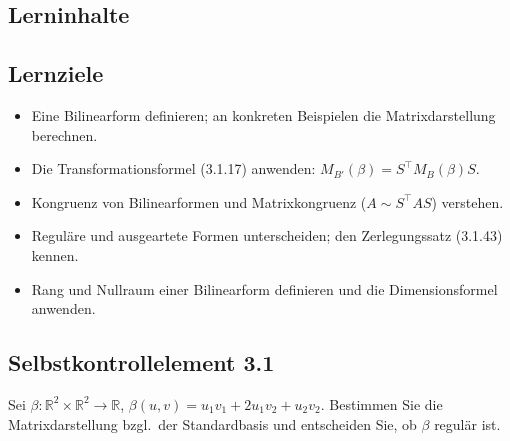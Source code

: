\documentclass[a4paper,12pt]{article}
\begin{document}
\subsection*{Lerninhalte}
\begin{center}
\end{center}

\subsection*{Lernziele}
\begin{itemize}
  \item Eine Bilinearform definieren; an konkreten Beispielen die Matrixdarstellung berechnen.
  \item Die Transformationsformel (3.1.17) anwenden: $M_{B'}(\beta) = S^\top M_B(\beta) S$.
  \item Kongruenz von Bilinearformen und Matrixkongruenz ($A \sim S^\top A S$) verstehen.
  \item Reguläre und ausgeartete Formen unterscheiden; den Zerlegungssatz (3.1.43) kennen.
  \item Rang und Nullraum einer Bilinearform definieren und die Dimensionsformel anwenden.
\end{itemize}

\subsection*{Selbstkontrollelement 3.1}
Sei $\beta: \mathbb{R}^2 \times \mathbb{R}^2 \to \mathbb{R}$, $\beta(u,v) = u_1 v_1 + 2 u_1 v_2 + u_2 v_2$.
Bestimmen Sie die Matrixdarstellung bzgl.\ der Standardbasis und entscheiden Sie, ob $\beta$ regulär ist.
\end{document}
